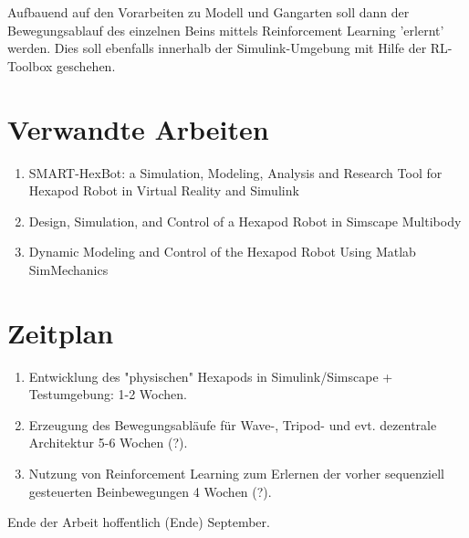Aufbauend auf den Vorarbeiten zu Modell und Gangarten soll dann der Bewegungsablauf des einzelnen Beins mittels Reinforcement Learning 'erlernt' werden. Dies soll ebenfalls innerhalb der Simulink-Umgebung mit Hilfe der RL-Toolbox geschehen.





\section{Verwandte Arbeiten}
\begin{enumerate}
\item SMART-HexBot: a Simulation, Modeling, Analysis and
Research Tool for Hexapod Robot in Virtual Reality and
Simulink

\item Design, Simulation, and Control of a Hexapod Robot in
Simscape Multibody

\item Dynamic Modeling and Control of the Hexapod Robot Using Matlab SimMechanics

\end{enumerate}


\section{Zeitplan}
\begin{enumerate}
	\item Entwicklung des "physischen" Hexapods in Simulink/Simscape + Testumgebung: 1-2 Wochen.
	\item Erzeugung des Bewegungsabläufe für Wave-, Tripod- und evt. dezentrale Architektur 5-6 Wochen (?).
	\item Nutzung von Reinforcement Learning zum Erlernen der vorher sequenziell gesteuerten Beinbewegungen 4 Wochen (?).
\end{enumerate}


Ende der Arbeit hoffentlich (Ende) September.